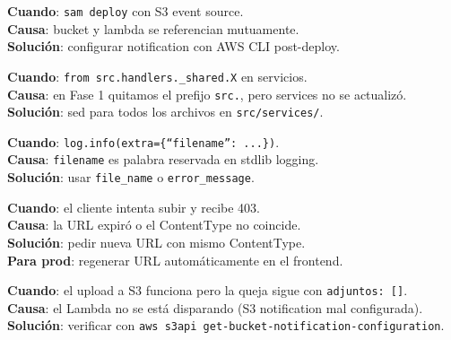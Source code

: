 \documentclass[11pt,a4paper,oneside]{article}
\begin{document}
\begin{tcolorbox}[colback=errred!5!white,colframe=errred,breakable,title={Error 1: Circular dependency}]
\textbf{Cuando}: \texttt{sam deploy} con S3 event source. \\
\textbf{Causa}: bucket y lambda se referencian mutuamente. \\
\textbf{Soluci\'on}: configurar notification con AWS CLI post-deploy.
\end{tcolorbox}

\begin{tcolorbox}[colback=errred!5!white,colframe=errred,breakable,title={Error 2: No module named 'src'}]
\textbf{Cuando}: \texttt{from src.handlers.\_shared.X} en servicios. \\
\textbf{Causa}: en Fase 1 quitamos el prefijo \texttt{src.}, pero services no se actualiz\'o. \\
\textbf{Soluci\'on}: sed para todos los archivos en \texttt{src/services/}.
\end{tcolorbox}

\begin{tcolorbox}[colback=errred!5!white,colframe=errred,breakable,title={Error 3: KeyError 'filename' en logger}]
\textbf{Cuando}: \texttt{log.info(extra=\{``filename'': ...\})}. \\
\textbf{Causa}: \texttt{filename} es palabra reservada en stdlib logging. \\
\textbf{Soluci\'on}: usar \texttt{file\_name} o \texttt{error\_message}.
\end{tcolorbox}

\begin{tcolorbox}[colback=errred!5!white,colframe=errred,breakable,title={Error 4: 403 al hacer PUT al presigned URL}]
\textbf{Cuando}: el cliente intenta subir y recibe 403. \\
\textbf{Causa}: la URL expir\'o o el ContentType no coincide. \\
\textbf{Soluci\'on}: pedir nueva URL con mismo ContentType. \\
\textbf{Para prod}: regenerar URL autom\'aticamente en el frontend.
\end{tcolorbox}

\begin{tcolorbox}[colback=errred!5!white,colframe=errred,breakable,title={Error 5: file\_processor no actualiza la queja}]
\textbf{Cuando}: el upload a S3 funciona pero la queja sigue con \texttt{adjuntos: []}. \\
\textbf{Causa}: el Lambda no se est\'a disparando (S3 notification mal configurada). \\
\textbf{Soluci\'on}: verificar con \texttt{aws s3api get-bucket-notification-configuration}.
\end{tcolorbox}
\end{document}
